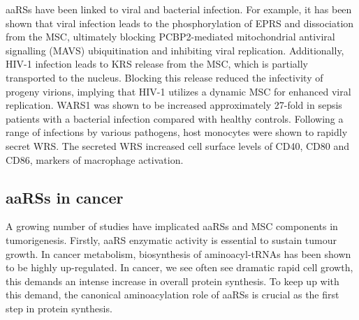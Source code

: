 aaRSs have been linked to viral and bacterial infection.
For example, it has been shown that viral infection leads to the phosphorylation of EPRS and dissociation from the MSC, ultimately blocking PCBP2-mediated mitochondrial antiviral signalling (MAVS) ubiquitination and inhibiting viral replication\cite{lee2016infection}.
Additionally, HIV-1 infection leads to KRS release from the MSC, which is partially transported to the nucleus.
Blocking this release reduced the infectivity of progeny virions, implying that HIV-1 utilizes a dynamic MSC for enhanced viral replication\cite{duchon2017hiv}.
WARS1 was shown to be increased approximately 27-fold in sepsis patients with a bacterial infection compared with healthy controls. Following a range of infections by various pathogens, host monocytes were shown to rapidly secret WRS.
The secreted WRS increased cell surface levels of CD40, CD80 and CD86, markers of macrophage activation\cite{ahn2016secreted}.

\subsection{aaRSs in cancer}
A growing number of studies have implicated aaRSs and MSC components in tumorigenesis.
Firstly, aaRS enzymatic activity is essential to sustain tumour growth. In cancer metabolism, biosynthesis of aminoacyl-tRNAs has been shown to be highly up-regulated\cite{hu2013heterogeneity}.
In cancer, we see often see dramatic rapid cell growth, this demands an intense increase in overall protein synthesis. To keep up with this demand, the canonical aminoacylation role of aaRSs is crucial as the first step in protein synthesis.

